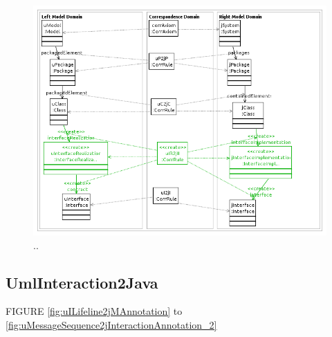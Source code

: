 \documentclass[tuberlin,cic,tc,english,noabntcite]{iiufrgs}
\begin{document}
\begin{figure}[h]
    \caption{..}
    \begin{center}
        \includegraphics[width=40em]{uIRealization2jIImplementation}
    \end{center}
    \label{fig:uIRealization2jIImplementation}
\end{figure}

\subsection{UmlInteraction2Java}
FIGURE \ref{fig:uILifeline2jMAnnotation} to \ref{fig:uMessageSequence2jInteractionAnnotation_2}
\end{document}

